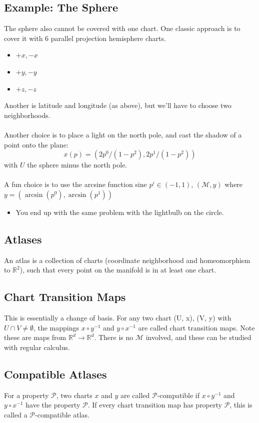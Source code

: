 \documentclass[10pt]{article}
\newcommand{\R}{\mathbb{R}}
\begin{document}
\subsection*{Example: The Sphere}
The sphere also cannot be covered with one chart.  One classic approach is to cover it with 6 parallel projection hemisphere charts.
\begin{itemize}
    \item $+x, -x$
    \item $+y, -y$
    \item $+z, -z$
\end{itemize}
Another is latitude and longitude (as above), but we'll have to choose two neighborhoods.\\\\
Another choice is to place a light on the north pole, and cast the shadow of a point onto the plane:
\[x(p) = (2p^0 / (1 - p^2), 2p^1 / (1 - p^2))\]
with $U$ the sphere minus the north pole.\\\\
A fun choice is to use the arcsine function sine $p^i \in (-1, 1)$, $(\mathcal{M}, y)$ where $y = (\arcsin(p^0), \arcsin(p^1))$
\begin{itemize}
    \item You end up with the same problem with the lightbulb on the circle.
\end{itemize}

\subsection*{Atlases}
An atlas is a collection of charts (coordinate neighborhood and homeomorphism to $\R^2$), such that every point on the manifold is in at least one chart.
\subsection*{Chart Transition Maps}
This is essentially a change of basis.  For any two chart (U, x), (V, y) with $U \cap V \neq \emptyset$, the mappings $x \circ y^{-1}$ and $y \circ x^{-1}$ are called chart transition maps.  Note these are maps from $\R^d \rightarrow \R^d$.  There is no $\mathcal{M}$ involved, and these can be studied with regular calculus.

\subsection*{Compatible Atlases}
For a property $\mathcal{P}$, two charts $x$ and $y$ are called $\mathcal{P}$-compatible if $x \circ y^{-1}$ and $y \circ x^{-1}$ have the property $\mathcal{P}$.  If every chart transition map has property $\mathcal{P}$, this is called a $\mathcal{P}$-compatible atlas.
\end{document}
